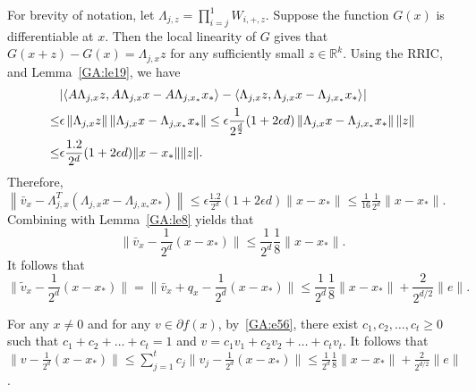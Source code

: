 For brevity of notation, let $\Lambda_{j, z} = \prod_{i = j}^1 W_{i, +, z}$.
Suppose the function $G(x)$ is differentiable at $x$. Then the local linearity of $G$ gives that $G(x + z) - G(x) = \Lambda_{j, x} z$ for any sufficiently small $z \in \mathbb{R}^k$. Using the RRIC, \cite[(10)]{HV17} and Lemma~\ref{GA:le19}, we have
\begin{align*}
&|\langle A \Lambda_{j, x} z, A \Lambda_{j, x} x - A \Lambda_{j, x_*} x_*\rangle - \inner[]{\Lambda_{j, x} z}{\Lambda_{j, x} x - \Lambda_{j, x_*} x_*} | \\
\leq& \epsilon \left\| \Lambda_{j, x} z \right\| \left\| \Lambda_{j, x} x - \Lambda_{j, x_*} x_* \right\| \leq \epsilon \frac{1}{2^{\frac{d}{2}}} (1 + 2 \epsilon d) \left\| \Lambda_{j, x} x - \Lambda_{j, x_*} x_* \right\| \|z\|\\
\leq& \epsilon \frac{1.2}{2^{d}} (1 + 2 \epsilon d) \|x - x_*\| \|z\|.
\end{align*}
Therefore, $\left\|\bar{v}_{x} - \Lambda_{j, x}^T (\Lambda_{j, x} x - \Lambda_{j, x_*} x_* )\right\| \leq \epsilon \frac{1.2}{2^{d}} (1 + 2 \epsilon d) \|x - x_*\| \leq \frac{1}{16} \frac{1}{2^d} \|x - x_*\|$. Combining with Lemma~\ref{GA:le8} yields that
$$
\|\bar{v}_{x} - \frac{1}{2^d} (x - x_*)\| \leq \frac{1}{2^d} \frac{1}{8} \|x - x_*\|.
$$
It follows that
$$
\|\tilde{v}_x - \frac{1}{2^d} (x - x_*)\| = \|\bar{v}_x + q_x - \frac{1}{2^d} (x - x_*)\| \leq \frac{1}{2^d} \frac{1}{8} \|x - x_*\| + \frac{2}{2^{d/2}} \|e\|.
$$

For any $x \neq 0$ and for any $v \in \partial f(x)$, by~\eqref{GA:e56}, there exist $c_1, c_2, \ldots, c_t \geq 0$ such that $c_1 + c_2 + \ldots + c_t = 1$ and $v = c_1 v_1 + c_2 v_2 + \ldots + c_t v_t$. It follows that
$\|v - \frac{1}{2^d} (x - x_*)\| \leq \sum_{j = 1}^t c_j \|v_j - \frac{1}{2^d} (x - x_*)\| \leq \frac{1}{2^d} \frac{1}{8} \|x - x_*\| + \frac{2}{2^{d/2}} \|e\|$.




%



